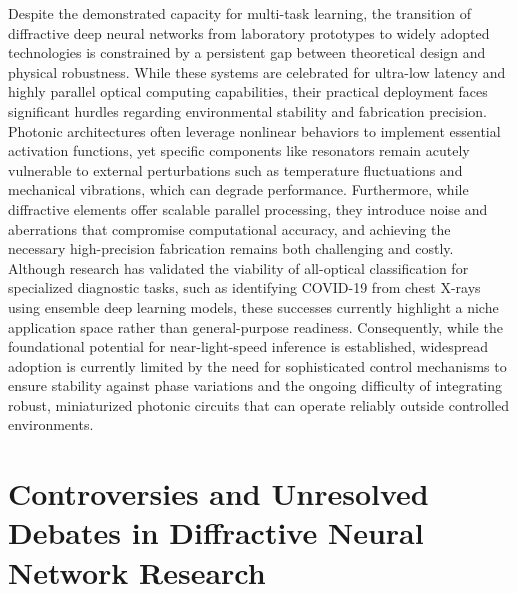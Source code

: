 Despite the demonstrated capacity for multi-task learning, the transition of diffractive deep neural networks from laboratory prototypes to widely adopted technologies is constrained by a persistent gap between theoretical design and physical robustness. While these systems are celebrated for ultra-low latency and highly parallel optical computing capabilities, their practical deployment faces significant hurdles regarding environmental stability and fabrication precision. Photonic architectures often leverage nonlinear behaviors to implement essential activation functions, yet specific components like resonators remain acutely vulnerable to external perturbations such as temperature fluctuations and mechanical vibrations, which can degrade performance. Furthermore, while diffractive elements offer scalable parallel processing, they introduce noise and aberrations that compromise computational accuracy, and achieving the necessary high-precision fabrication remains both challenging and costly. Although research has validated the viability of all-optical classification for specialized diagnostic tasks, such as identifying COVID-19 from chest X-rays using ensemble deep learning models, these successes currently highlight a niche application space rather than general-purpose readiness. Consequently, while the foundational potential for near-light-speed inference is established, widespread adoption is currently limited by the need for sophisticated control mechanisms to ensure stability against phase variations and the ongoing difficulty of integrating robust, miniaturized photonic circuits that can operate reliably outside controlled environments. \citep{doi_10_3390_nano14080697_c372a140} \citep{doi_10_3390_app122010535_b538921c} \citep{doi_10_1364_josab_497148_b087424b}

\section{Controversies and Unresolved Debates in Diffractive Neural Network Research}\label{controversies-and-unresolved-debates-in-diffractive-neural-network-research}

